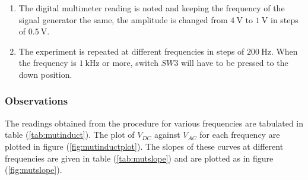 \documentclass[%
 reprint,
nofootinbib,
 amsmath,amssymb,
 aps,
]{revtex4-2}
\begin{document}
\begin{enumerate}
                \item The digital multimeter reading is noted and keeping the frequency of the signal generator the same, the amplitude is changed from $\SI{4}{\volt}$ to $\SI{1}{\volt}$ in steps of $\SI{0.5}{\volt}$.
                \item The experiment is repeated at different frequencies in steps of $\SI{200}{\hertz}$. When the frequency is $\SI{1}{\kilo \hertz}$ or more, switch $SW3$ will have to be pressed to the down position.
            \end{enumerate}
            
        \subsubsection{Observations}
            The readings obtained from the procedure for various frequencies are tabulated in table (\ref{tab:mutinduct}). The plot of $V_{DC}$ against $V_{AC}$ for each frequency are plotted in figure (\ref{fig:mutinductplot}). The slopes of these curves at different frequencies are given in table (\ref{tab:mutslope}) and are plotted as in figure (\ref{fig:mutslope}).
\end{document}
